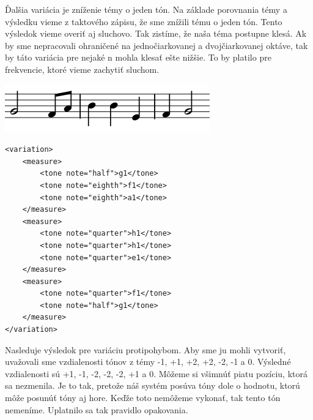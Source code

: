 Ďalšia variácia je zníženie témy o jeden tón. Na základe porovnania témy a výsledku vieme z taktového zápisu, že sme znížili tému o jeden tón. Tento výsledok vieme overiť aj sluchovo. Tak zistíme, že naša téma postupne klesá. Ak by sme nepracovali ohraničené na jednočiarkovanej a dvojčiarkovanej oktáve, tak by táto variácia pre nejaké n mohla klesať ešte nižšie. To by platilo pre frekvencie, ktoré vieme zachytiť sluchom.

\begin{minipage}{.45\textwidth}
\includegraphics[width=\textwidth]{thesis/obrazky-figures/var4.png}
\end{minipage}%
\begin{minipage}{.5\textwidth}
\centering
\lstset{language=XML}
\begin{lstlisting}[basicstyle=\tiny]
<variation>
    <measure>
        <tone note="half">g1</tone>
        <tone note="eighth">f1</tone>
        <tone note="eighth">a1</tone>
    </measure>
    <measure>
        <tone note="quarter">h1</tone>
        <tone note="quarter">h1</tone>
        <tone note="quarter">e1</tone>
    </measure>
    <measure>
        <tone note="quarter">f1</tone>
        <tone note="half">g1</tone>
    </measure>
</variation>
\end{lstlisting}
\end{minipage}

Nasleduje výsledok pre variáciu protipohybom. Aby sme ju mohli vytvoriť, uvažovali sme vzdialenosti tónov z témy -1, +1, +2, +2, -2, -1 a 0. Výsledné vzdialenosti sú +1, -1, -2, -2, -2, +1 a 0. Môžeme si všimnúť piatu pozíciu, ktorá sa nezmenila. Je to tak, pretože náš systém posúva tóny dole o hodnotu, ktorú môže posunúť tóny aj hore. Keďže toto nemôžeme vykonať, tak tento tón nemeníme. Uplatnilo sa tak pravidlo opakovania.

